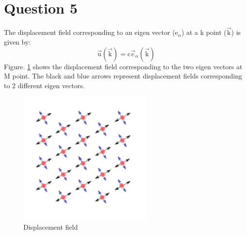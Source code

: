 \documentclass[a4paper]{article}
\begin{document}
\section*{Question 5}
The displacement field corresponding to an eigen vector ($\mathrm{e}_{\alpha}$) at a k point ($\vec{\mathrm{k}}$) is given by:  
\begin{equation}
    \vec{\mathrm{u}}({\vec{\mathrm{k}}})= \mathrm{c}\vec{e}_{\alpha}(\vec{\mathrm{k}})
\end{equation}
Figure. \ref{fig:3} shows the displacement field corresponding to the two eigen vectors at $\mathrm{M}$ point. The black and blue arrows represent displacement fields corresponding to 2 different eigen vectors. 
\begin{figure}[htpb]
    \centering
    \includegraphics[width=0.6\textwidth]{vec.pdf}
    \caption{Displacement field}
    \label{fig:3}
\end{figure}
\end{document}
